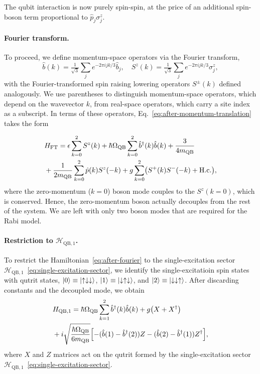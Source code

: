 \documentclass[reprint, aps, prx, amsmath, amssymb, longbibliography, superscriptaddress]{revtex4-2}
\DeclareMathOperator{\Zthree}{\mathbb{Z}_3}
\begin{document}
The qubit interaction is now purely spin-spin, at the price of an additional
spin-boson term proportional to $\hat p_j \sigma_j^z$.

\paragraph{Fourier transform.}

To proceed, we define momentum-space operators via the Fourier transform,
\begin{equation}
\hat b(k)= \tfrac{1}{\sqrt{3}}\sum_{j}e^{-2\pi i jk/3}\hat b_j,\quad S^z(k)= \tfrac{1}{\sqrt{3}}\sum_{j}e^{-2\pi i jk/3}\sigma_j^z,
\end{equation}
with the Fourier-transformed spin raising lowering operators $S^{\pm}(k)$ defined analogously. We use parentheses to distinguish momentum-space operators, which depend on the wavevector $k$, from real-space operators, which carry a site index as a subscript.  In terms of these operators, Eq.~\eqref{eq:after-momentum-translation} takes the form 

\begin{align}
    \label{eq:after-fourier}
    &H_{\text{FT}} = \epsilon \sum_{k=0}^{2} S^{z}(k)
      + \hbar \Omega_{\text{QB}} \sum_{k=0}^{2} \hat b^{\dagger}(k) \hat b(k)
                         + \frac{3}{4 m_{\text{QB}}} \\
     &+\frac{1}{2 m_{\text{QB}}} \sum_{k=0}^{2} \hat p(k) S^{z}(-k)
            + g \sum_{k=0}^{2} \bigl( S^{+}(k) S^{-}(-k) + \text{H.c.} \bigr),\notag
\end{align}
where the zero-momentum ($k=0$) boson mode
couples to the $S^z(k=0)$, which is conserved.  Hence, the zero-momentum boson actually decouples from the rest of the system. We are left with only two boson modes that are required for the $\Zthree$ Rabi model.

\paragraph{Restriction to $\mathcal H_{\text{QB},1}$.}
To restrict the Hamiltonian~\eqref{eq:after-fourier} to the single-excitation sector $\mathcal{H}_{\text{QB},1}$~\eqref{eq:single-excitation-sector}, we identify the single-excitatioin spin states with qutrit states, $\ket{0} \equiv \ket{\uparrow\downarrow\downarrow}$, $ \ket{1} \equiv \ket{\downarrow\uparrow\downarrow}$, and $ \ket{2} \equiv \ket{\downarrow\downarrow\uparrow} $. After discarding constants and the decoupled mode, we obtain
\begin{align}
\label{eq:rabi-wrong-basis}
    &H_{\text{QB},1} = \hbar \Omega_{\text{QB}} \sum_{k=1}^{2} \hat b^{\dagger}(k)
      \hat b(k) + g \bigl( X + X^{\dagger} \bigr)
      \\
      &+ i \sqrt{ \frac{\hbar \Omega_{\text{QB}}}{6 m_{\text{QB}}} }
        \Bigl[ -( \hat b(1) - \hat b^{\dagger}(2) ) Z
        - ( \hat b(2) - \hat b^{\dagger}(1) ) Z^{\dagger} \Bigr], \notag
\end{align}
where $X$ and $Z$ matrices act on the qutrit formed by the single-excitation sector $\mathcal{H}_{\text{QB},1}$~\eqref{eq:single-excitation-sector}.
\end{document}
